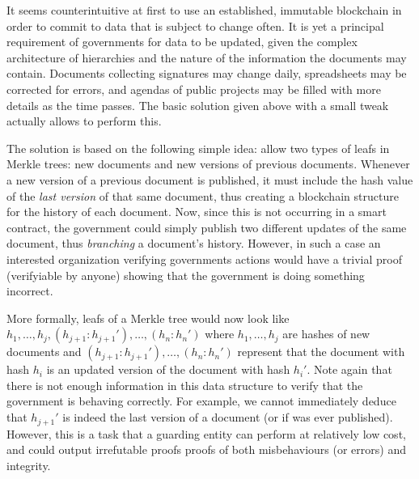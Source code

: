 
It seems counterintuitive at first to use an established, immutable blockchain in order to commit to data that is subject to change often. It is yet a principal requirement of governments for data to be updated, given the complex architecture of hierarchies and the nature of the information the documents may contain. Documents collecting signatures may change daily, spreadsheets may be corrected for errors, and agendas of public projects may be filled with more details as the time passes. The basic solution given above with a small tweak actually allows to perform this.

The solution is based on the following simple idea: allow two types of leafs in Merkle trees: new documents and new versions of previous documents. Whenever a new version of a previous document is published, it must include the hash value of the \emph{last version} of that same document, thus creating a blockchain structure for the history of each document. Now, since this is not occurring in a smart contract, the government could simply publish two different updates of the same document, thus \emph{branching} a document's history. However, in such a case an interested organization verifying governments actions would have a trivial proof (verifyiable by anyone) showing that the government is doing something incorrect.

More formally, leafs of a Merkle tree would now look like $h_1,\ldots,h_j,(h_{j+1}:h_{j+1}'), \ldots,(h_n:h_n')$ where $h_1,\ldots,h_j$ are hashes of new documents and $(h_{j+1}:h_{j+1}'), \ldots,(h_n:h_n')$ represent that the document with hash $h_{i}$ is an updated version of the document with hash $h_{i}'$. Note again that there is not enough information in this data structure to verify that the government is behaving correctly. For example, we cannot immediately deduce that $h_{j+1}'$ is indeed the last version of a document (or if was ever published). However, this is a task that a guarding entity can perform at relatively low cost, and could output irrefutable proofs proofs of both misbehaviours (or errors) and integrity.  
